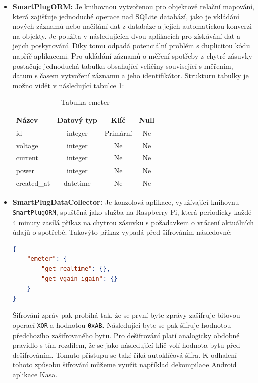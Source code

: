 \documentclass[czech,master,dept460,male,cpp,cpdeclaration,oneside]{diploma}
\begin{document}
\begin{itemize}
\item \textbf{SmartPlugORM:}
Je knihovnou vytvořenou pro objektově relační mapování\autocite{PofEAA}, která zajišťuje jednoduché operace nad SQLite databází, jako je vkládání nových záznamů nebo načítání dat z databáze a jejich automatickou konverzi na objekty. Je použita v následujících dvou aplikacích pro získávání dat a jejich poskytování. Díky tomu odpadá potenciální problém s duplicitou kódu napříč aplikacemi. Pro ukládání záznamů o měření spotřeby z chytré zásuvky postačuje jednoduchá tabulka obsahující veličiny související s měřením, datum s časem vytvoření záznamu a jeho identifikátor. Strukturu tabulky je možno vidět v následující tabulce \ref{tab:Table emeter}:

\bigbreak

\begin{table}[ht!]
	\centering
	\begin{tabular}{lccc}
		\hline
		Název & Datový typ & Klíč & Null \\
		\hline
		id & integer & Primární & Ne \\
		voltage & integer & Ne & Ne \\
		current & integer & Ne & Ne \\
		power & integer & Ne & Ne \\
		created_at & datetime & Ne & Ne \\
		\hline
	\end{tabular}
	\caption{Tabulka emeter}
	\label{tab:Table emeter}
\end{table}

\item \textbf{SmartPlugDataCollector:}
Je konzolová aplikace, využívající knihovnu \texttt{SmartPlugORM}, spuštěná jako služba na Raspberry Pi, která periodicky každé 4 minuty zasílá příkaz na chytrou zásuvku s požadavkem o vrácení aktuálních údajů o spotřebě. Takovýto příkaz vypadá před šifrováním následovně:
\bigbreak
\begin{lstlisting}[language=json,caption=TP-Link HS110 příkaz pro získání okamžitých údajů o spotřebě]
{
	"emeter": {
		"get_realtime": {},
		"get_vgain_igain": {}
	}
}
\end{lstlisting}
\bigbreak
\noindent Šifrování zpráv pak probíhá tak, že se první byte zprávy zašifruje bitovou operací \texttt{XOR} a hodnotou \texttt{0xAB}. Následující byte se pak šifruje hodnotou předchozího zašifrovaného bytu. Pro dešifrování platí analogicky obdobné pravidlo s tím rozdílem, že se jako následující klíč volí hodnota bytu před dešifrováním. Tomuto přístupu se také říká autoklíčová šifra. K odhalení tohoto způsobu šifrování můžeme využít například dekompilace Android aplikace Kasa\autocite{KASA}.


\end{itemize}
\end{document}
